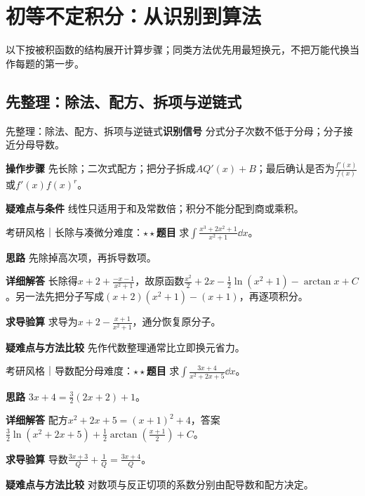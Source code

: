 \section{初等不定积分：从识别到算法}\label{ic:indefinite_classical_complete}

\begin{examtip}以下按被积函数的结构展开计算步骤；同类方法优先用最短换元，不把万能代换当作每题的第一步。\end{examtip}

\subsection{先整理：除法、配方、拆项与逆链式}\label{ic:indefinite_classical_complete:normalize}\begin{method}{先整理：除法、配方、拆项与逆链式}\textbf{识别信号} 分式分子次数不低于分母；分子接近分母导数。\par \textbf{操作步骤} 先长除；二次式配方；把分子拆成$A Q'(x)+B$；最后确认是否为$\frac{f'(x)}{f(x)}$或$f'(x)f(x)^r$。\par \textbf{疑难点与条件} 线性只适用于和及常数倍；积分不能分配到商或乘积。\end{method}

\begin{example}{考研风格｜长除与凑微分}{难度：$\star\star$}\label{ic:ex:indefinite_classical_complete:division}\textbf{题目} 求$\int\frac{x^3+2x^2+1}{x^2+1}\dd x$。\par \textbf{思路} 先除掉高次项，再拆导数项。\par \textbf{详细解答} 长除得$x+2+\frac{-x-1}{x^2+1}$，故原函数$\frac{x^2}{2}+2x-\frac12\ln(x^2+1)-\arctan x+C$。另一法先把分子写成$(x+2)(x^2+1)-(x+1)$，再逐项积分。\par \textbf{求导验算} 求导为$x+2-\frac{x+1}{x^2+1}$，通分恢复原分子。\par \textbf{疑难点与方法比较} 先作代数整理通常比立即换元省力。\end{example}

\begin{example}{考研风格｜导数配分母}{难度：$\star\star$}\label{ic:ex:indefinite_classical_complete:affine}\textbf{题目} 求$\int\frac{3x+4}{x^2+2x+5}\dd x$。\par \textbf{思路} $3x+4=\frac32(2x+2)+1$。\par \textbf{详细解答} 配方$x^2+2x+5=(x+1)^2+4$，答案$\frac32\ln(x^2+2x+5)+\frac12\arctan(\frac{x+1}{2})+C$。\par \textbf{求导验算} 导数$\frac{3x+3}{Q}+\frac1Q=\frac{3x+4}{Q}$。\par \textbf{疑难点与方法比较} 对数项与反正切项的系数分别由配导数和配方决定。\end{example}

